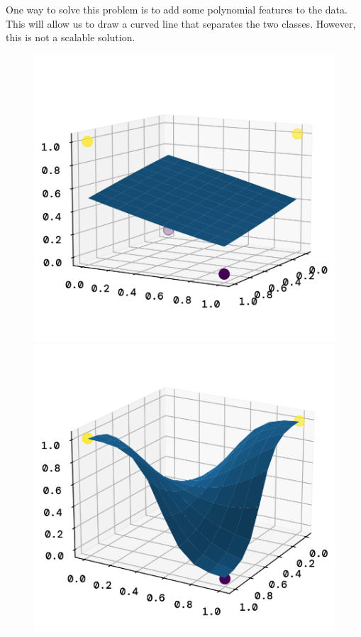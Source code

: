 \documentclass[twoside,11pt]{report}
\begin{document}
One way to solve this problem is to add some polynomial features to the data. 
This will allow us to draw a curved line that separates the two classes. However, this is not a scalable solution.

\begin{figure}[h]
\begin{minipage}{0.5\textwidth}
    \begin{center}
        \includegraphics[width=\textwidth]{../runsAndFigures/xor_plain.png}
        \caption{}\label{fig:xor_plain}
    \end{center}
\end{minipage}
\begin{minipage}{0.5\textwidth}
    \begin{center}
        \includegraphics[width=\textwidth]{../runsAndFigures/xor_poly.png}

\end{center}
\end{minipage}
\end{figure}
\end{document}

